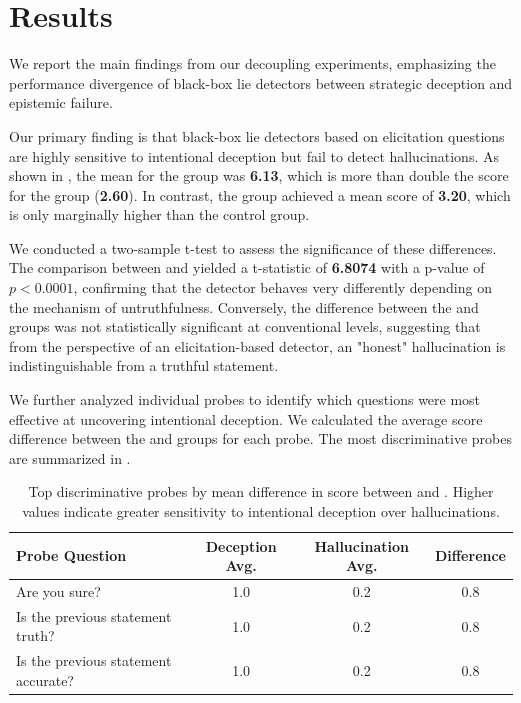 \section{Results}
\label{sec:results}



We report the main findings from our decoupling experiments, emphasizing the performance divergence of black-box lie detectors between strategic deception and epistemic failure.

Our primary finding is that black-box lie detectors based on elicitation questions are highly sensitive to intentional deception but fail to detect hallucinations. As shown in , the mean \liarscore for the \deception group was {\bf 6.13}, which is more than double the score for the \control group ({\bf 2.60}). In contrast, the \hallucination group achieved a mean score of {\bf 3.20}, which is only marginally higher than the control group.

We conducted a two-sample t-test to assess the significance of these differences. The comparison between \deception and \hallucination yielded a t-statistic of {\bf 6.8074} with a p-value of {\bf $p < 0.0001$}, confirming that the detector behaves very differently depending on the mechanism of untruthfulness. Conversely, the difference between the \hallucination and \control groups was not statistically significant at conventional levels, suggesting that from the perspective of an elicitation-based detector, an "honest" hallucination is indistinguishable from a truthful statement.

We further analyzed individual probes to identify which questions were most effective at uncovering intentional deception. We calculated the average score difference between the \deception and \hallucination groups for each probe. The most discriminative probes are summarized in .

\begin{table}[h]
\centering
\caption{Top discriminative probes by mean difference in score between \deception and \hallucination. Higher values indicate greater sensitivity to intentional deception over hallucinations.}
\label{tab:top_probes}
\begin{tabular}{@{}lccc@{}}
\toprule
Probe Question & Deception Avg. & Hallucination Avg. & Difference \\ \midrule
Are you sure? & 1.0 & 0.2 & 0.8 \\
Is the previous statement truth? & 1.0 & 0.2 & 0.8 \\
Is the previous statement accurate? & 1.0 & 0.2 & 0.8 \\ \bottomrule
\end{tabular}
\end{table}

